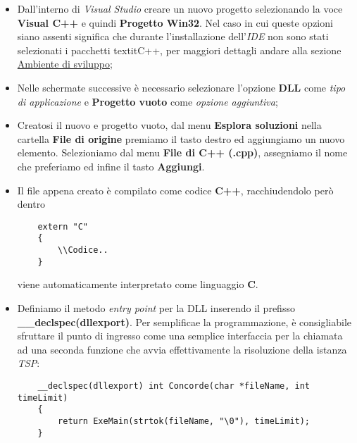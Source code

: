 \documentclass[11pt]{article}
\begin{document}
\begin{itemize}
    \item Dall'interno di \textit{Visual Studio} creare un nuovo progetto selezionando la voce \textbf{Visual C++} e quindi \textbf{Progetto Win32}. Nel caso in cui queste opzioni siano assenti significa che durante l'installazione dell'\textit{IDE} non sono stati selezionati i pacchetti textit{C++}, per maggiori dettagli andare alla sezione \hyperref[sec:AmbienteSviluppoS]{Ambiente di sviluppo};
    \item Nelle schermate successive è necessario selezionare l'opzione \textbf{DLL} come \textit{tipo di applicazione} e \textbf{Progetto vuoto} come \textit{opzione aggiuntiva};
    \item Creatosi il nuovo e progetto vuoto, dal menu \textbf{Esplora soluzioni} nella cartella \textbf{File di origine} premiamo il tasto destro ed aggiungiamo un nuovo elemento. Selezioniamo dal menu \textbf{File di C++ (.cpp)}, assegniamo il nome che preferiamo ed infine il tasto \textbf{Aggiungi}.
    \item Il file appena creato è compilato come codice \textbf{C++}, racchiudendolo però dentro
    \begin{lstlisting}
    extern "C"
    {
        \\Codice..
    }
    \end{lstlisting}
    viene automaticamente interpretato come linguaggio \textbf{C}.
    \item Definiamo il metodo \textit{entry point} per la DLL inserendo il prefisso \textbf{\_\_declspec(dllexport)}. Per semplificae la programmazione, è consigliabile sfruttare il punto di ingresso come una semplice interfaccia per la chiamata ad una seconda funzione che avvia effettivamente la risoluzione della istanza \textit{TSP}:
    
    \begin{lstlisting}
    __declspec(dllexport) int Concorde(char *fileName, int timeLimit)
    {
        return ExeMain(strtok(fileName, "\0"), timeLimit);
    }
    \end{lstlisting}
    

\end{itemize}
\end{document}
